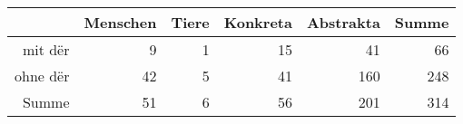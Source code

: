 \begin{tabular}{rrrrrr}
  \hline
 & Menschen & Tiere & Konkreta & Abstrakta & Summe \\ 
  \hline
mit dër & 9 & 1 & 15 & 41 & 66 \\ 
  ohne dër & 42 & 5 & 41 & 160 & 248 \\ 
  Summe & 51 & 6 & 56 & 201 & 314 \\ 
   \hline
\end{tabular}
